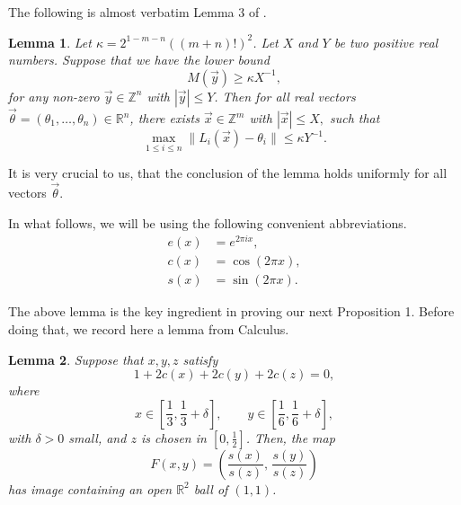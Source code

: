 \documentclass[12pt]{article}
\newtheorem{lemma}{Lemma}
\theoremstyle{definition}
\newcommand{\Z}{\mathbb{Z}}
\begin{document}
The following is almost verbatim Lemma 3 of \cite{transfer}.
\begin{lemma}
    Let $\kappa=2^{1-m-n}((m+n)!)^2$. Let $X$ and $Y$ be two positive real numbers. Suppose that we have the lower bound
    \begin{equation}
        M(\vec{y})\geq \kappa X^{-1},
    \end{equation}
    for any non-zero $\vec{y}\in\Z^n$ with $|\vec{y}|\leq Y$. Then for all real vectors $\vec{\theta}=(\theta_1,\dots,\theta_n)\in\mathbb{R}^n$, there exists $\vec{x}\in\Z^m$ with $|\vec{x}|\leq X,$ such that 
    \begin{equation}\label{inhom}
        \max_{1\leq i\leq n} \|L_i(\vec{x})-\theta_i   \|\leq \kappa Y^{-1}.
    \end{equation}
\end{lemma}
It is very crucial to us, that the conclusion of the lemma holds uniformly for all vectors $\vec{\theta}$.

In what follows, we will be using the following convenient abbreviations.
\begin{align*}
    e(x)&=e^{2\pi i x},\\
    c(x)&=\cos(2\pi x),\\
    s(x)&=\sin(2\pi x).
\end{align*}

The above lemma is the key ingredient in proving our next Proposition 1. Before doing that, we record here a lemma from Calculus.
\begin{lemma}

Suppose that $x,y,z$ satisfy
\[
1+2c(x)+2c(y)+2c(z)=0,
\]
where
\[
x\in\left[\frac13,\frac13+\delta\right],\qquad
y\in\left[\frac16,\frac16+\delta\right],
\]
with $\delta>0$ small, and $z$ is chosen in $[0,\frac12]$. Then, the map
\[
F(x,y)=\left(\frac{s(x)}{s(z)},\,\frac{s(y)}{s(z)}\right)
\]
has image containing an open $\mathbb{R}^2$ ball of $(1,1)$.
\end{lemma}
\end{document}
